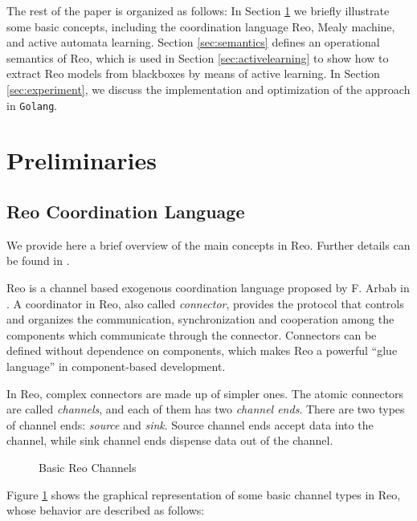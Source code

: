 \documentclass[conference, a4paper]{IEEEtran}
\begin{document}
The rest of the paper is organized as follows: In Section
\ref{sec:preliminaries} we briefly illustrate some basic concepts, including the coordination
language Reo, Mealy machine, and active automata learning. Section \ref{sec:semantics} defines an
operational semantics of Reo, which is used in Section \ref{sec:activelearning} to show how to
extract Reo models from blackboxes by means of active learning. In Section
\ref{sec:experiment}, we discuss the implementation and optimization of the approach in
\texttt{Golang}.

\section{Preliminaries} 
\label{sec:preliminaries}
\subsection{Reo Coordination Language} 
\label{sec:reo}
We provide here a brief overview of the main concepts in Reo. Further details can be found in
\cite{DBLP:journals/mscs/Arbab04, DBLP:journals/scp/BaierSAR06}.

Reo is a channel based exogenous coordination language proposed by F. Arbab in
\cite{DBLP:journals/mscs/Arbab04}. 
A coordinator in Reo, also called \emph{connector}, provides the protocol that controls and
organizes the communication, synchronization and cooperation among the components which
communicate through the connector. Connectors can be defined without dependence on components,
which makes Reo a powerful ``glue language'' in component-based
development\cite{DBLP:journals/sigsoft/Gill03}.

In Reo, complex connectors are made up of simpler ones. The atomic connectors are called
\emph{channels}, and each of them has two \emph{channel ends}. There are two types of channel ends:
\emph{source} and \emph{sink}. Source channel ends accept data into the channel, while sink
channel ends dispense data out of the channel. 

\begin{figure}[ht]
  \begin{center}
    
  \end{center}
  \caption{Basic Reo Channels}
  \label{fig:basic}
\end{figure}

Figure \ref{fig:basic} shows the graphical representation of some basic channel types in Reo, whose
behavior are described as follows:
\end{document}
